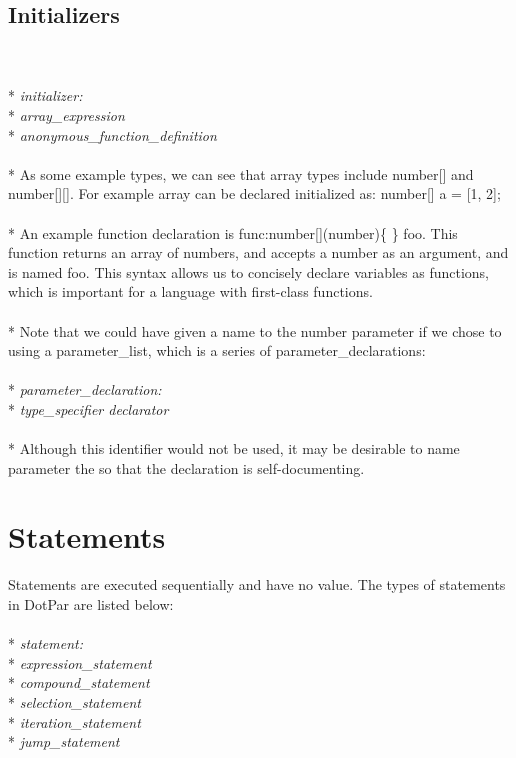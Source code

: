 \documentclass[11pt]{article}
\newcommand{\tab}{\hspace*{2em}}
\begin{document}
\subsection{Initializers}
\\ \\* \tab \emph{initializer:}
\\* \tab \tab \emph{array\_expression}
\\* \tab \tab \emph{anonymous\_function\_definition}
\\ \\* As some example types, we can see that array types include number[] and number[][]. For example array can be declared initialized as: number[] a = [1, 2];
\\ \\* An example function declaration is func:number[](number)\{ \} foo. This function returns an array of numbers, and accepts a number as an argument, and is named foo. This syntax allows us to concisely declare variables as functions, which is important for a language with first-class functions.
\\ \\* Note that we could have given a name to the number parameter if we chose to using a parameter\_list, which is a series of parameter\_declarations:
\\ \\* \tab \emph{parameter\_declaration:}
\\* \tab \tab \emph{type\_specifier declarator}
\\ \\* Although this identifier would not be used, it may be desirable to name parameter the so that the declaration is self-documenting.

\section{Statements}
Statements are executed sequentially and have no value. The types of statements in DotPar are listed below:
\\ \\* \tab \emph{statement:}
\\* \tab \tab \emph{expression\_statement}
\\* \tab \tab \emph{compound\_statement}
\\* \tab \tab \emph{selection\_statement}
\\* \tab \tab \emph{iteration\_statement}
\\* \tab \tab \emph{jump\_statement}
\end{document}
